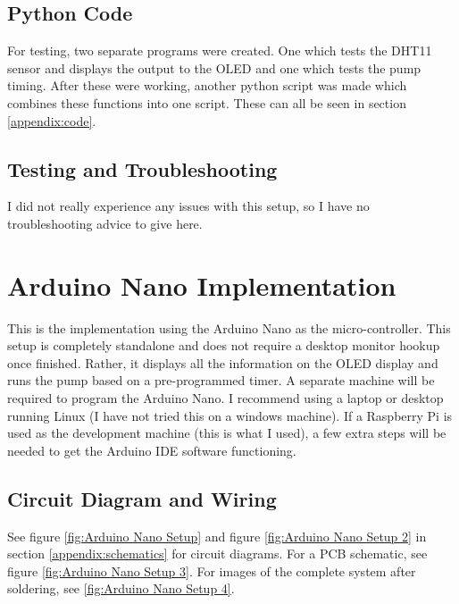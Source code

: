 \documentclass{article}
\begin{document}
\begin{multicols}{2}
		\subsection{Python Code}
		For testing, two separate programs were created. One which tests the DHT11 sensor and displays the output to the OLED and one which tests the pump timing. After these were working, another python script was made which combines these functions into one script. These can all be seen in section \ref{appendix:code}.
		
		\subsection{Testing and Troubleshooting}
		I did not really experience any issues with this setup, so I have no troubleshooting advice to give here.
		
		\section{Arduino Nano Implementation}
		This is the implementation using the Arduino Nano as the micro-controller. This setup is completely standalone and does not require a desktop monitor hookup once finished. Rather, it displays all the information on the OLED display and runs the pump based on a pre-programmed timer. A separate machine will be required to program the Arduino Nano. I recommend using a laptop or desktop running Linux (I have not tried this on a windows machine). If a Raspberry Pi is used as the development machine (this is what I used), a few extra steps will be needed to get the Arduino IDE software functioning. 
		
		\subsection{Circuit Diagram and Wiring}
		See figure \ref{fig:Arduino Nano Setup} and figure \ref{fig:Arduino Nano Setup 2} in section \ref{appendix:schematics} for circuit diagrams. For a PCB schematic, see figure \ref{fig:Arduino Nano Setup 3}. For images of the complete system after soldering, see \ref{fig:Arduino Nano Setup 4}.
		
		
		

\end{multicols}
\end{document}
